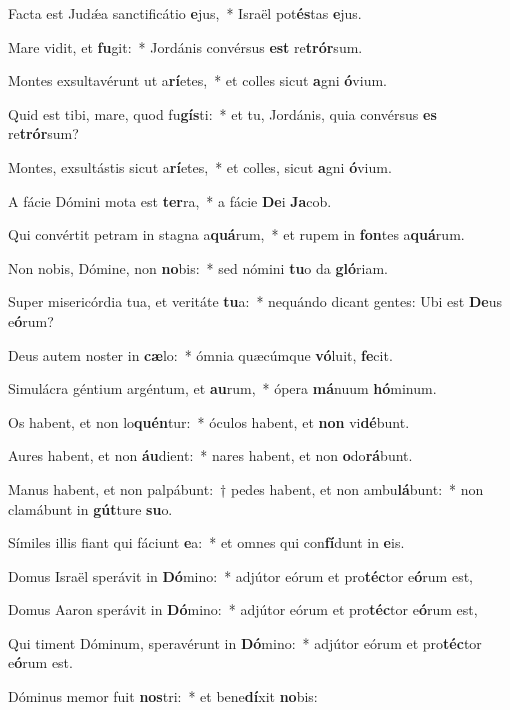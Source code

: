 \item Facta est Judǽa sanctificátio \textbf{e}jus,~* Israël pot\textbf{és}tas \textbf{e}jus.
\item Mare vidit, et \textbf{fu}git:~* Jordánis convérsus \textbf{est} re\textbf{trór}sum.
\item Montes exsultavérunt ut a\textbf{rí}etes,~* et colles sicut \textbf{a}gni \textbf{ó}vium.
\item Quid est tibi, mare, quod fu\textbf{gís}ti:~* et tu, Jordánis, quia convérsus \textbf{es} re\textbf{trór}sum?
\item Montes, exsultástis sicut a\textbf{rí}etes,~* et colles, sicut \textbf{a}gni \textbf{ó}vium.
\item A fácie Dómini mota est \textbf{ter}ra,~* a fácie \textbf{De}i \textbf{Ja}cob.
\item Qui convértit petram in stagna a\textbf{quá}rum,~* et rupem in \textbf{fon}tes a\textbf{quá}rum.
\item Non nobis, Dómine, non \textbf{no}bis:~* sed nómini \textbf{tu}o da \textbf{gló}riam.
\item Super misericórdia tua, et veritáte \textbf{tu}a:~* nequándo dicant gentes: Ubi est \textbf{De}us e\textbf{ó}rum?
\item Deus autem noster in \textbf{cæ}lo:~* ómnia quæcúmque \textbf{vó}luit, \textbf{fe}cit.
\item Simulácra géntium argéntum, et \textbf{au}rum,~* ópera \textbf{má}nuum \textbf{hó}minum.
\item Os habent, et non lo\textbf{quén}tur:~* óculos habent, et \textbf{non} vi\textbf{dé}bunt.
\item Aures habent, et non \textbf{áu}dient:~* nares habent, et non \textbf{o}do\textbf{rá}bunt.
\item Manus habent, et non palpábunt:~† pedes habent, et non ambu\textbf{lá}bunt:~* non clamábunt in \textbf{gút}ture \textbf{su}o.
\item Símiles illis fiant qui fáciunt \textbf{e}a:~* et omnes qui con\textbf{fí}dunt in \textbf{e}is.
\item Domus Israël sperávit in \textbf{Dó}mino:~* adjútor eórum et pro\textbf{téc}tor e\textbf{ó}rum est,
\item Domus Aaron sperávit in \textbf{Dó}mino:~* adjútor eórum et pro\textbf{téc}tor e\textbf{ó}rum est,
\item Qui timent Dóminum, speravérunt in \textbf{Dó}mino:~* adjútor eórum et pro\textbf{téc}tor e\textbf{ó}rum est.
\item Dóminus memor fuit \textbf{nos}tri:~* et bene\textbf{dí}xit \textbf{no}bis:
